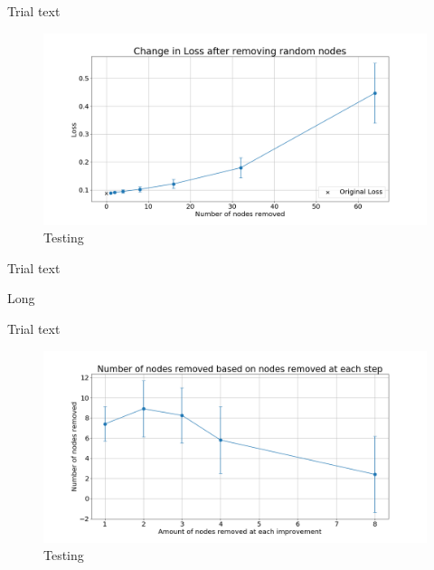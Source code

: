 \documentclass[UKenglish]{ifimaster}
\begin{document}
            Trial text

            \begin{figure}[h!]\centering
                \includegraphics[width=\textwidth]{Loss_change_random_removal_mnist.png}
                \caption[Short title]{Testing}
                \label{fig:loss_rn_mnist}
            \end{figure}

            Trial text

            \begin{table}[h!]
                \centering
                \resizebox{\textwidth}{!}{}
                \caption[Short]{Long}
                \label{tab:nr_rnd_rem_imp_mnist}
            \end{table}

            Trial text

            \begin{figure}[h!]\centering
                \includegraphics[width=\textwidth]{Num_rem_vs_size_removed_mnist.png}
                \caption[Short title]{Testing}
                \label{fig:num_rem_rn_imp_mnist}
            \end{figure}
\end{document}
